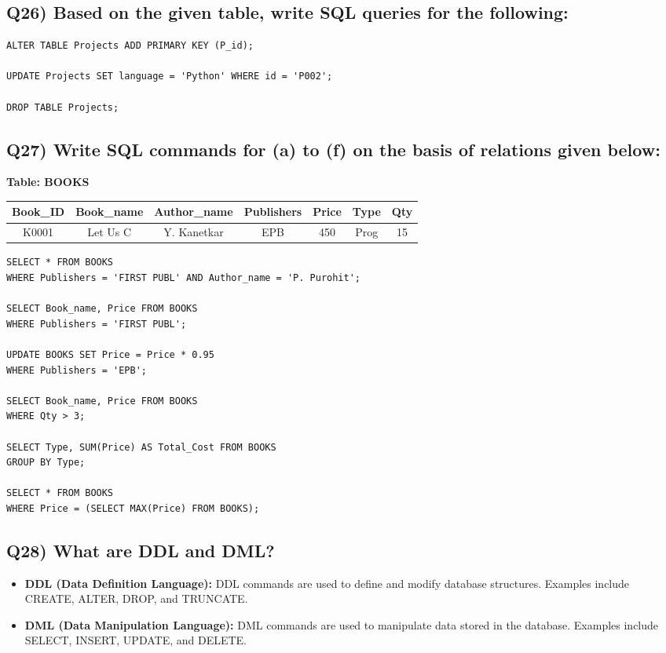 \documentclass{article}
\begin{document}
\subsection*{Q26) Based on the given table, write SQL queries for the following:}

\begin{lstlisting}
ALTER TABLE Projects ADD PRIMARY KEY (P_id);

UPDATE Projects SET language = 'Python' WHERE id = 'P002';

DROP TABLE Projects;
\end{lstlisting}

\subsection*{Q27) Write SQL commands for (a) to (f) on the basis of relations given below:}

\textbf{Table: BOOKS}
\begin{center}
\begin{tabular}{|c|c|c|c|c|c|c|}
\hline
Book\_ID & Book\_name & Author\_name & Publishers & Price & Type & Qty \\
\hline
K0001 & Let Us C & Y. Kanetkar & EPB & 450 & Prog & 15 \\
\hline
\end{tabular}
\end{center}

\begin{lstlisting}
SELECT * FROM BOOKS 
WHERE Publishers = 'FIRST PUBL' AND Author_name = 'P. Purohit';

SELECT Book_name, Price FROM BOOKS 
WHERE Publishers = 'FIRST PUBL';

UPDATE BOOKS SET Price = Price * 0.95 
WHERE Publishers = 'EPB';

SELECT Book_name, Price FROM BOOKS 
WHERE Qty > 3;

SELECT Type, SUM(Price) AS Total_Cost FROM BOOKS 
GROUP BY Type;

SELECT * FROM BOOKS 
WHERE Price = (SELECT MAX(Price) FROM BOOKS);
\end{lstlisting}

\subsection*{Q28) What are DDL and DML?}
\begin{itemize}
\item \textbf{DDL (Data Definition Language):} DDL commands are used to define and modify database structures. Examples include CREATE, ALTER, DROP, and TRUNCATE.

\item \textbf{DML (Data Manipulation Language):} DML commands are used to manipulate data stored in the database. Examples include SELECT, INSERT, UPDATE, and DELETE.
\end{itemize}
\end{document}
